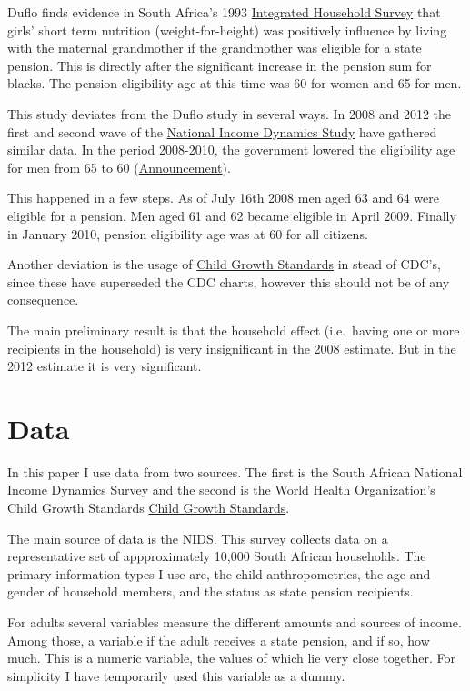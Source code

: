 \documentclass[draft.tex]{subfiles}
\begin{document}
Duflo finds evidence in South Africa's 1993
\href{http://microdata.worldbank.org/index.php/catalog/297}{Integrated
Household Survey} that girls' short term nutrition (weight-for-height)
was positively influence by living with the maternal grandmother if the
grandmother was eligible for a state pension. This is directly after the
significant increase in the pension sum for blacks. The
pension-eligibility age at this time was 60 for women and 65 for men.

This study deviates from the Duflo study in several ways. In 2008 and
2012 the first and second wave of the
\href{http://www.nids.uct.ac.za/home/}{National Income Dynamics Study}
have gathered similar data. In the period 2008-2010, the government
lowered the eligibility age for men from 65 to 60
(\href{http://www.southafrica.info/services/government/pension-160708.htm}{Announcement}).

This happened in a few steps. As of July 16th 2008 men aged 63 and 64
were eligible for a pension. Men aged 61 and 62 became eligible in April
2009. Finally in January 2010, pension eligibility age was at 60 for all
citizens.

Another deviation is the usage of
\href{http://www.who.int/childgrowth/en/}{Child Growth Standards} in
stead of CDC's, since these have superseded the CDC charts, however this
should not be of any consequence.

The main preliminary result is that the household effect (i.e.~having
one or more recipients in the household) is very insignificant in the
2008 estimate. But in the 2012 estimate it is very significant.

\section{Data}

In this paper I use data from two sources. The first is the South
African National Income Dynamics Survey and the second is the World
Health Organization's Child Growth Standards
\href{http://www.who.int/childgrowth/en/}{Child Growth Standards}.

The main source of data is the NIDS. This survey collects data on a
representative set of appproximately 10,000 South African households.
The primary information types I use are, the child anthropometrics, the
age and gender of household members, and the status as state pension
recipients.

For adults several variables measure the different amounts and sources
of income. Among those, a variable if the adult receives a state
pension, and if so, how much. This is a numeric variable, the values of
which lie very close together. For simplicity I have temporarily used
this variable as a dummy.
\end{document}
